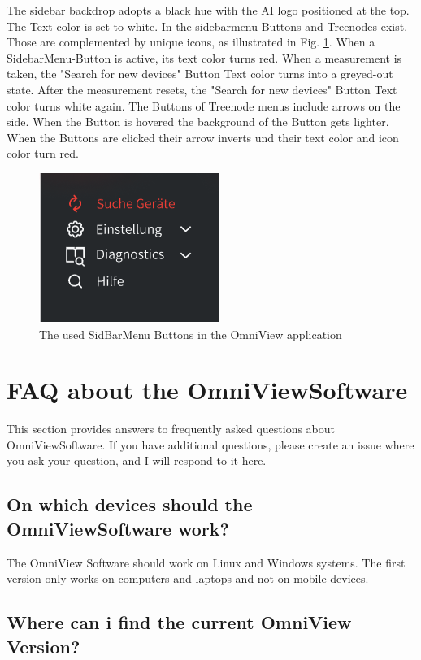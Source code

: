 \documentclass[]{scrreprt}
\begin{document}
\begin{itemize}
The sidebar backdrop adopts a black hue with the AI logo positioned at the top. The Text color is set to white. 
In the sidebarmenu Buttons and Treenodes exist. Those are complemented by unique icons, as illustrated in Fig. \ref{fig: SideMenuIcons}.
 When a SidebarMenu-Button is active, its text color turns red. When a measurement is taken, the "Search for new devices" Button Text color turns into a greyed-out state.
  After the measurement resets, the "Search for new devices" Button Text color turns white again. The Buttons of Treenode menus include arrows on the side. 
   When the Button is hovered the background of the Button gets lighter.
 When the Buttons are clicked their arrow inverts und their text color and icon color turn red. 

\begin{figure}
    \includegraphics[width=.4\textwidth]{assets/pictures/SideBarMenuButtons.png}
    \caption[]{The used SidBarMenu Buttons in the OmniView application}
    \label{fig: SideMenuIcons}
\end{figure}


    \section{FAQ about the OmniViewSoftware}

    This section provides answers to frequently asked questions about OmniViewSoftware. If you have additional questions, please create an issue where you ask your question, and I will respond to it here.

    \subsection{On which devices should the OmniViewSoftware work?}

    The OmniView Software should work on Linux and Windows systems. The first version only works on computers and laptops and not on mobile devices.

    \subsection{Where can i find the current OmniView Version?}


\end{itemize}
\end{document}
